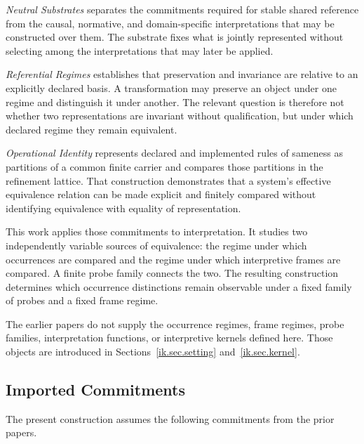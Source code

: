 \documentclass[11pt]{article}
\theoremstyle{plain}
\theoremstyle{definition}
\theoremstyle{remark}
\begin{document}
\emph{Neutral Substrates} separates the commitments required for stable shared
reference from the causal, normative, and domain-specific interpretations
that may be constructed over them.
The substrate fixes what is jointly represented
without selecting among the interpretations that may later be applied.

\emph{Referential Regimes} establishes that preservation and invariance
are relative to an explicitly declared basis.
A transformation may preserve an object under one regime
and distinguish it under another.
The relevant question is therefore not whether two representations
are invariant without qualification,
but under which declared regime they remain equivalent.

\emph{Operational Identity} represents declared and implemented rules of sameness
as partitions of a common finite carrier
and compares those partitions in the refinement lattice.
That construction demonstrates that a system's effective equivalence relation
can be made explicit and finitely compared
without identifying equivalence with equality of representation.

This work applies those commitments to interpretation.
It studies two independently variable sources of equivalence:
the regime under which occurrences are compared
and the regime under which interpretive frames are compared.
A finite probe family connects the two.
The resulting construction determines which occurrence distinctions
remain observable under a fixed family of probes and a fixed frame regime.

The earlier papers do not supply the occurrence regimes,
frame regimes,
probe families,
interpretation functions,
or interpretive kernels defined here.
Those objects are introduced in Sections~\ref{ik.sec.setting}
and~\ref{ik.sec.kernel}.

\subsection{Imported Commitments}

The present construction assumes the following commitments from the prior papers.
\end{document}
